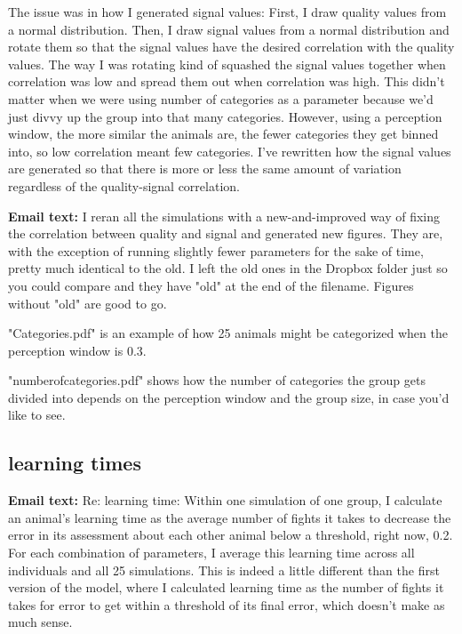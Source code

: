 The issue was in how I generated signal values: First, I draw quality values from a normal distribution. Then, I draw signal values from a normal distribution and rotate them so that the signal values have the desired correlation with the quality values. The way I was rotating kind of squashed the signal values together when correlation was low and spread them out when correlation was high. This didn't matter when we were using number of categories as a parameter because we'd just divvy up the group into that many categories. However, using a perception window, the more similar the animals are, the fewer categories they get binned into, so low correlation meant few categories. I've rewritten how the signal values are generated so that there is more or less the same amount of variation regardless of the quality-signal correlation.

\textbf{Email text: }I reran all the simulations with a new-and-improved way of fixing the correlation between quality and signal and generated new figures. They are, with the exception of running slightly fewer parameters for the sake of time, pretty much identical to the old. I left the old ones in the Dropbox folder just so you could compare and they have "old" at the end of the filename. Figures without "old" are good to go.

"Categories.pdf" is an example of how 25 animals might be categorized when the perception window is 0.3.

"numberofcategories.pdf" shows how the number of categories the group gets divided into depends on the perception window and the group size, in case you'd like to see.

\subsection*{learning times}

\textbf{Email text:} Re: learning time: Within one simulation of one group, I calculate an animal's learning time as the average number of fights it takes to decrease the error in its assessment about each other animal below a threshold, right now, 0.2. For each combination of parameters, I average this learning time across all individuals and all 25 simulations. This is indeed a little different than the first version of the model, where I calculated learning time as the number of fights it takes for error to get within a threshold of its final error, which doesn't make as much sense.

